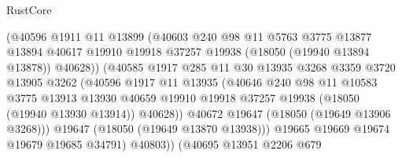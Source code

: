 \begin{lexlean}{RustCore}
\begin{coremodule}
                              (@40596
                                @1911
                                @11
                                @13899
                                (@40603
                                  @240
                                  @98
                                  @11
                                  @5763
                                  @3775
                                  @13877
                                  @13894
                                  @40617
                                  @19910
                                  @19918
                                  @37257
                                  @19938
                                  (@18050 (@19940 @13894 @13878))
                                  @40628))
                              (@40585
                                @1917
                                @285
                                @11
                                @30
                                @13935
                                @3268
                                @3359
                                @3720
                                @13905
                                @3262
                                (@40596
                                  @1917
                                  @11
                                  @13935
                                  (@40646
                                    @240
                                    @98
                                    @11
                                    @10583
                                    @3775
                                    @13913
                                    @13930
                                    @40659
                                    @19910
                                    @19918
                                    @37257
                                    @19938
                                    (@18050 (@19940 @13930 @13914))
                                    @40628))
                                @40672
                                @19647
                                (@18050 (@19649 @13906 @3268)))
                              @19647
                              (@18050 (@19649 @13870 @13938)))
                            @19665
                            @19669
                            @19674
                            @19679
                            @19685
                            @34791)
                          @40803))
                      (@40695
                        @13951
                        @2206
                        @679

\end{coremodule}
\end{lexlean}

